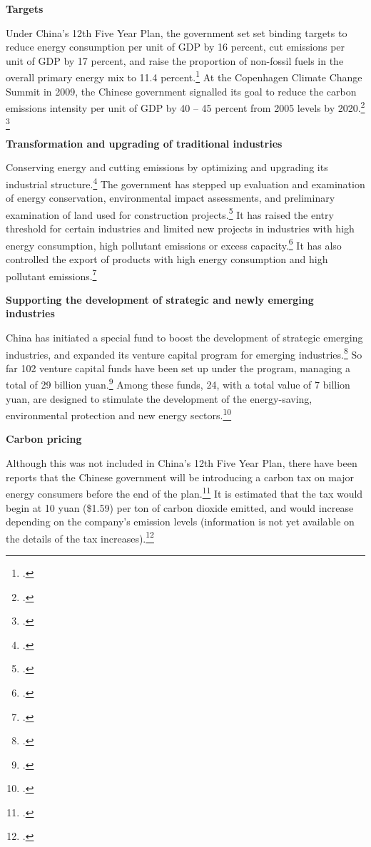 \textbf{Targets}



Under China's 12th Five Year Plan, the government set set binding targets to reduce energy consumption per unit of GDP by 16 percent, cut  emissions per unit of GDP by 17 percent, and raise the proportion of non-fossil fuels in the overall primary energy mix to 11.4 percent.\footcite[][]{FiveYearPlan}
At the Copenhagen Climate Change Summit in 2009, the Chinese government signalled its goal to reduce the carbon emissions intensity per unit of GDP by 40 -- 45 percent from 2005 levels by 2020.\footcite[][p. 108]{UNHumanDev2013} \footcite[][]{FiveYearPlan}



\textbf{Transformation and upgrading of traditional industries}



Conserving energy and cutting emissions by optimizing and upgrading its industrial structure.\footcite[][]{ChinaRestructuring}
The government has stepped up evaluation and examination of energy conservation, environmental impact assessments, and preliminary examination of land used for construction projects.\footcite[][]{ChinaRestructuring}
It has raised the entry threshold for certain industries and limited new projects in industries with high energy consumption, high pollutant emissions or excess capacity.\footcite[][]{ChinaRestructuring}
It has also controlled the export of products with high energy consumption and high pollutant emissions.\footcite[][]{ChinaRestructuring}



\textbf{Supporting the development of strategic and newly emerging industries}



China has initiated a special fund to boost the development of strategic emerging industries, and expanded its venture capital program for emerging industries.\footcite[][]{EmergingIndustries}
So far 102 venture capital funds have been set up under the program, managing a total of 29 billion yuan.\footcite[][]{EmergingIndustries}
Among these funds, 24, with a total value of 7 billion yuan, are designed to stimulate the development of the energy-saving, environmental protection and new energy sectors.\footcite[][]{EmergingIndustries}




\textbf{Carbon pricing}



Although this was not included in China's 12th Five Year Plan, there have been reports that the Chinese government will be introducing a carbon tax on major energy consumers before the end of the plan.\footcite[][]{ChinaCarbonTax}
It is estimated that the tax would begin at 10 yuan (\$1.59) per ton of carbon dioxide emitted, and would increase depending on the company’s emission levels (information is not yet available on the details of the tax increases).\footcite[][]{ChinaCarbonTax}




